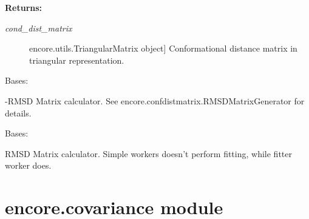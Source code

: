 \documentclass[letterpaper,10pt,english]{sphinxmanual}
\begin{document}
\begin{fulllineitems}
\begin{fulllineitems}
\begin{description}
\end{description}

\textbf{Returns:}
\begin{description}
\item[{\emph{cond\_dist\_matrix}}] \leavevmode{[}encore.utils.TriangularMatrix object{]}
Conformational distance matrix in triangular representation.

\end{description}

\end{fulllineitems}


\end{fulllineitems}


\begin{fulllineitems}
\label{index:encore.confdistmatrix.MinusRMSDMatrixGenerator}
Bases: {\hyperref[index:encore.confdistmatrix.ConformationalDistanceMatrixGenerator]{}}

-RMSD Matrix calculator. See encore.confdistmatrix.RMSDMatrixGenerator for details.

\end{fulllineitems}


\begin{fulllineitems}
\label{index:encore.confdistmatrix.RMSDMatrixGenerator}
Bases: {\hyperref[index:encore.confdistmatrix.ConformationalDistanceMatrixGenerator]{}}

RMSD Matrix calculator. Simple workers doesn't perform fitting, while fitter worker does.

\end{fulllineitems}



\section{encore.covariance module}
\label{index:module-encore.covariance}\label{index:encore-covariance-module}
\end{document}

